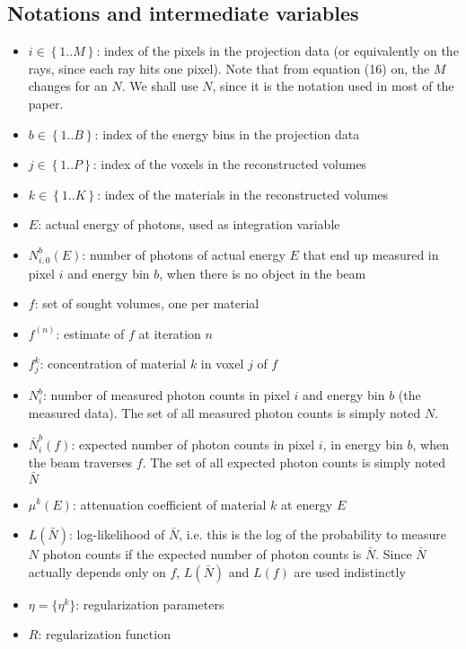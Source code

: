 \documentclass[a4paper, 10pt]{article}
\begin{document}
\subsection{Notations and intermediate variables}
\begin{itemize}
  \item $i \in \left\lbrace1..M\right\rbrace$: index of the pixels in the projection data (or equivalently on the rays, since each ray hits one pixel). Note that from equation (16) on, 
  the $M$ changes for an $N$. We shall use $N$, since it is the notation used in most of the paper.
  \item $b \in \left\lbrace1..B\right\rbrace$: index of the energy bins in the projection data
  \item $j \in \left\lbrace1..P\right\rbrace$: index of the voxels in the reconstructed volumes
  \item $k \in \left\lbrace1..K\right\rbrace$: index of the materials in the reconstructed volumes
  \item $E$: actual energy of photons, used as integration variable
  \item $N_{i,0}^b(E)$: number of photons of actual energy $E$ that end up measured in pixel $i$ and energy bin $b$, when there is no object in the beam
  \item $f$: set of sought volumes, one per material
  \item $f^{(n)}$: estimate of $f$ at iteration $n$
  \item $f_j^k$: concentration of material $k$ in voxel $j$ of $f$
  \item $N_i^b$: number of measured photon counts in pixel $i$ and energy bin $b$ (the measured data). The set of all measured photon counts is simply noted $N$.
  \item $\bar{N}_i^b(f)$: expected number of photon counts in pixel $i$, in energy bin $b$, when the beam traverses $f$. The set of all expected photon counts is simply noted $\bar{N}$
  \item $\mu^k(E)$: attenuation coefficient of material $k$ at energy $E$
  \item $L(\bar{N})$: log-likelihood of $\bar{N}$, i.e. this is the log of the probability to measure $N$ photon counts if the expected number of photon counts is $\bar{N}$. Since $\bar{N}$ actually depends only on $f$, $L(\bar{N})$ and $L(f)$ are used indistinctly
  \item $\eta = \{\eta^k\}$: regularization parameters
  \item $R$: regularization function

\end{itemize}
\end{document}
